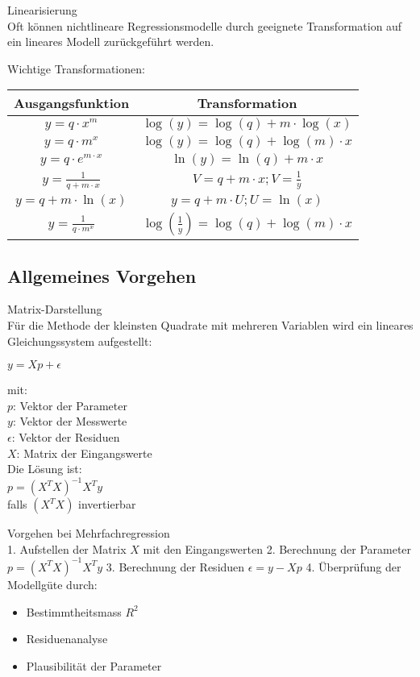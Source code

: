 \begin{concept}{Linearisierung}\\
Oft können nichtlineare Regressionsmodelle durch geeignete Transformation auf ein lineares Modell zurückgeführt werden.

Wichtige Transformationen:\\
\begin{center}
\begin{tabular}{|c|c|}
\hline
Ausgangsfunktion & Transformation \\
\hline
$y = q \cdot x^m$ & $\log(y) = \log(q) + m \cdot \log(x)$ \\
\hline
$y = q \cdot m^x$ & $\log(y) = \log(q) + \log(m) \cdot x$ \\
\hline
$y = q \cdot e^{m \cdot x}$ & $\ln(y) = \ln(q) + m \cdot x$ \\
\hline
$y = \frac{1}{q+m \cdot x}$ & $V = q + m \cdot x; V = \frac{1}{y}$ \\
\hline
$y = q + m \cdot \ln(x)$ & $y = q + m \cdot U; U = \ln(x)$ \\
\hline
$y = \frac{1}{q \cdot m^x}$ & $\log(\frac{1}{y}) = \log(q) + \log(m) \cdot x$ \\
\hline
\end{tabular}
\end{center}
\end{concept}

\subsection{Allgemeines Vorgehen}

\begin{concept}{Matrix-Darstellung}\\
Für die Methode der kleinsten Quadrate mit mehreren Variablen wird ein lineares Gleichungssystem aufgestellt:

$y = Xp + \epsilon$

mit:\\
$p$: Vektor der Parameter\\
$y$: Vektor der Messwerte\\
$\epsilon$: Vektor der Residuen\\
$X$: Matrix der Eingangswerte\\

Die Lösung ist:\\
$p = (X^TX)^{-1}X^Ty$\\
falls $(X^TX)$ invertierbar
\end{concept}

\begin{KR}{Vorgehen bei Mehrfachregression}\\
1. Aufstellen der Matrix $X$ mit den Eingangswerten
2. Berechnung der Parameter $p = (X^TX)^{-1}X^Ty$
3. Berechnung der Residuen $\epsilon = y - Xp$
4. Überprüfung der Modellgüte durch:
   \begin{itemize}
     \item Bestimmtheitsmass $R^2$
     \item Residuenanalyse
     \item Plausibilität der Parameter
   \end{itemize}
\end{KR}